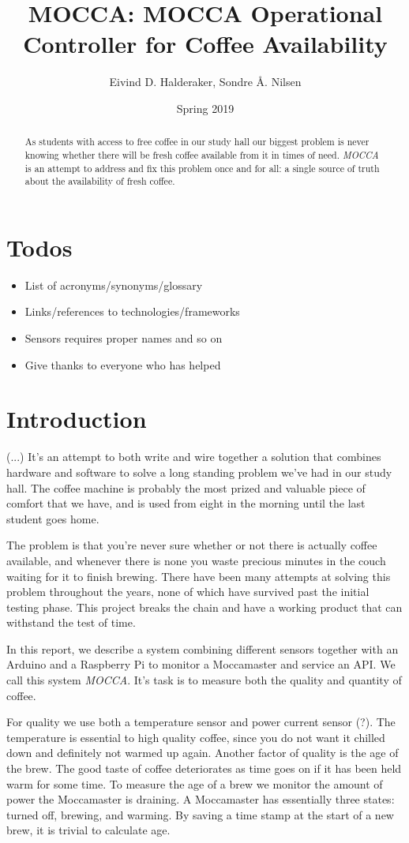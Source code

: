 \documentclass[12pt,a4paper,oneside,article]{memoir}
\title{MOCCA: MOCCA Operational Controller for Coffee Availability}
\author{Eivind D. Halderaker, Sondre Å. Nilsen}
\date{Spring 2019}
\numberwithin{equation}{chapter}
\begin{document}


\tableofcontents

\begin{abstract}
  As students with access to free coffee in our study hall our biggest problem
  is never knowing whether there will be fresh coffee available from it in times
  of need. \textit{MOCCA} is an attempt to address and fix this problem once and
  for all: a single source of truth about the availability of fresh coffee.
\end{abstract}

\section{Todos}
\begin{itemize}
\item List of acronyms/synonyms/glossary
\item Links/references to technologies/frameworks
\item Sensors requires proper names and so on
\item Give thanks to everyone who has helped
\end{itemize}

\section{Introduction}\label{sec:introduction}
(...) It's an attempt to both write and wire together a solution that combines
hardware and software to solve a long standing problem we've had in our study
hall. The coffee machine is probably the most prized and valuable piece of
comfort that we have, and is used from eight in the morning until the last
student goes home.

The problem is that you're never sure whether or not there is actually coffee
available, and whenever there is none you waste precious minutes in the couch
waiting for it to finish brewing. There have been many attempts at solving this
problem throughout the years, none of which have survived past the initial
testing phase. This project breaks the chain and have a working product that can
withstand the test of time.

In this report, we describe a system combining different sensors together with
an Arduino and a Raspberry Pi to monitor a Moccamaster and service an API. We
call this system \textit{MOCCA}. It's task is to measure both the quality and
quantity of coffee.

For quality we use both a temperature sensor and power current sensor (?). The
temperature is essential to high quality coffee, since you do not want it
chilled down and definitely not warmed up again. Another factor of quality is
the age of the brew. The good taste of coffee deteriorates as time goes on if it
has been held warm for some time. To measure the age of a brew we monitor the
amount of power the Moccamaster is draining. A Moccamaster has essentially three
states: turned off, brewing, and warming. By saving a time stamp at the start of
a new brew, it is trivial to calculate age.
\end{document}
